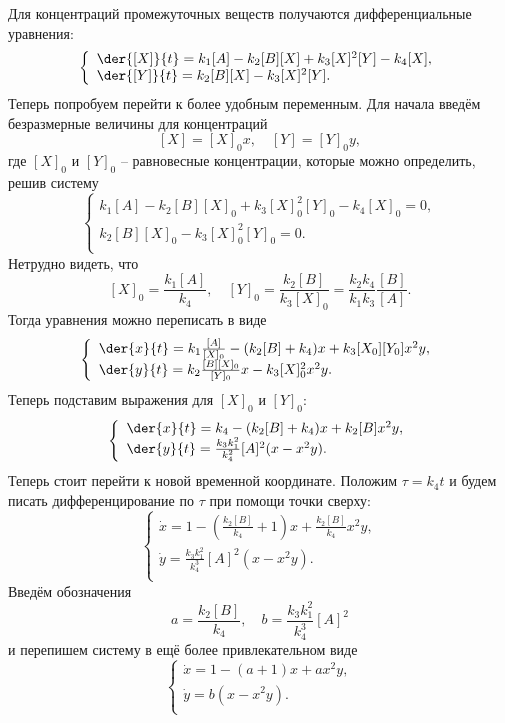 Для концентраций промежуточных веществ получаются дифференциальные уравнения:
\[
    \left\{
        \begin{array}{l}
            \der{[X]}{t} = k_1[A] - k_2[B][X] + k_3[X]^2[Y] - k_4[X],\\
            \der{[Y]}{t} = k_2[B][X] - k_3[X]^2[Y].\\
        \end{array}
    \right.
\]
Теперь попробуем перейти к более удобным переменным. Для начала введём
безразмерные величины для концентраций
\[
    [X] = [X]_0 x,\quad [Y] = [Y]_0 y,
\]
где \( [X]_0 \) и \( [Y]_0 \) -- равновесные концентрации, которые можно
определить, решив систему
\[
    \left\{
        \begin{array}{l}
            k_1[A] - k_2[B][X]_0 + k_3[X]_0^2[Y]_0 - k_4[X]_0 = 0,\\
            k_2[B][X]_0 - k_3[X]_0^2[Y]_0 = 0.\\
        \end{array}
    \right.
\]
Нетрудно видеть, что
\[
    [X]_0 = \frac{k_1 [A]}{k_4},\quad [Y]_0 = \frac{k_2[B]}{k_3[X]_0} =
        \frac{k_2k_4}{k_1k_3}\frac{[B]}{[A]}.
\]
Тогда уравнения можно переписать в виде
\[
    \left\{
        \begin{array}{l}
            \der{x}{t} = k_1\frac{[A]}{[X]_0} - (k_2[B] + k_4)x +
                k_3[X_0][Y_0]x^2y,\\
            \der{y}{t} = k_2\frac{[B][X]_0}{[Y]_0}x -
                k_3[X]_0^2x^2y.\\
        \end{array}
    \right.
\]
Теперь подставим выражения для \( [X]_0 \) и \( [Y]_0 \):
\[
    \left\{
        \begin{array}{l}
            \der{x}{t} = k_4 - (k_2[B] + k_4)x + k_2[B]x^2y,\\
            \der{y}{t} = \frac{k_3k_1^2}{k_4^2}[A]^2 (x - x^2y).\\
        \end{array}
    \right.
\]
Теперь стоит перейти к новой временной координате. Положим \( \tau = k_4t \) и
будем писать дифференцирование по \( \tau \) при помощи точки сверху:
\[
    \left\{
        \begin{array}{l}
            \dot{x} = 1 - (\frac{k_2[B]}{k_4} + 1)x + \frac{k_2[B]}{k_4}x^2y,\\
            \dot{y} = \frac{k_3k_1^2}{k_4^3}[A]^2 (x - x^2y).\\
        \end{array}
    \right.
\]
Введём обозначения
\[
    a = \frac{k_2[B]}{k_4},\quad b = \frac{k_3k_1^2}{k_4^3}[A]^2
\]
и перепишем систему в ещё более привлекательном виде
\[
    \left\{
        \begin{array}{l}
            \dot{x} = 1 - (a + 1)x + ax^2y,\\
            \dot{y} = b(x - x^2y).\\
        \end{array}
    \right.
\]

